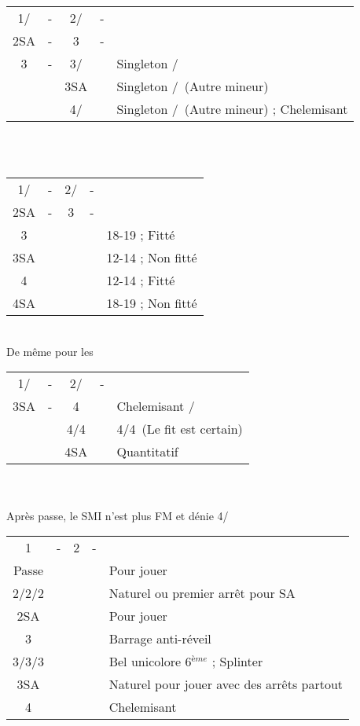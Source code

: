 \documentclass[a4paper, oneside, 11pt]{report}
\begin{document}
		\begin{tabular}{cccc|l}
		1\trefle/\carreau & - & 2\trefle/\carreau & - &\\
		2SA & - & 3\trefle & - &\\
		3\carreau & - & 3\coeur/\pique && Singleton \coeur/\pique\\	
		&& 3SA && Singleton \carreau/\trefle\ (Autre mineur)\\
		&& 4\trefle/\carreau && Singleton \carreau/\trefle\ (Autre mineur) ; Chelemisant\\
		\end{tabular}\\\\

		\begin{tabular}{cccc|l}
		1\trefle/\carreau & - & 2\trefle/\carreau & - &\\
		2SA & - & 3\carreau & - &\\
		3\coeur &&&& 18-19 ; Fitté\\
		3SA &&&& 12-14 ; Non fitté\\
		4\coeur &&&& 12-14 ; Fitté\\
		4SA &&&& 18-19 ; Non fitté\\
		\end{tabular}\\
		De même pour les \pique\\

		\begin{tabular}{cccc|l}
		1\trefle/\carreau & - & 2\trefle/\carreau & - &\\
		3SA & - & 4\trefle && Chelemisant \trefle/\carreau\\
		&& 4\carreau/4\coeur && 4\coeur/4\pique\ (Le fit est certain)\\
		&& 4SA && Quantitatif\\
		\end{tabular}\\\\

\newpage
		Après passe, le SMI n'est plus FM et dénie 4\coeur/\pique\\
		
		\begin{tabular}{cccc|l}
		1\trefle & - & 2\trefle & - &\\
		Passe &&&& Pour jouer\\
		2\carreau/2\coeur/2\pique &&&& Naturel ou premier arrêt pour SA\\
		2SA &&&& Pour jouer\\
		3\trefle &&&& Barrage anti-réveil\\
		3\carreau/3\coeur/3\pique &&&& Bel unicolore 6$^{ème}$ ; Splinter\\
		3SA &&&& Naturel pour jouer avec des arrêts partout\\
		4\trefle &&&& Chelemisant \trefle\\
		\end{tabular}\\\\
\end{document}
